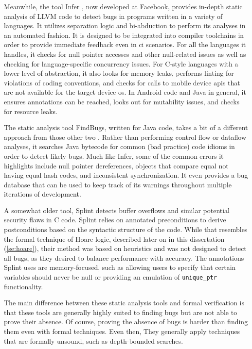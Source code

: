 Meanwhile, the tool Infer \autocite{calcagno2011infer}, now developed at Facebook,
provides in-depth static analysis of LLVM code to detect bugs in programs
written in a variety of languages.
It utilizes separation logic \autocite{reynolds2002separation}
and bi-abduction to perform its analyses in an automated fashion.
It is designed to be integrated into compiler toolchains
in order to provide immediate feedback even in \ac{ci} scenarios.
For all the languages it handles, it checks for null pointer accesses
and other null-related issues as well as checking for language-specific
concurrency issues.
For C-style languages with a lower level of abstraction,
it also looks for memory leaks, performs linting for violations of coding conventions,
and checks for calls to mobile device \acp{api} that are not available
for the target device \ac{os}.
In Android code and Java in general, it ensures annotations can be reached,
looks out for mutability issues, and checks for resource leaks.

The static analysis tool FindBugs, written for Java code,
takes a bit of a different approach from those other two
\autocite{hovemeyer2004findbugs}.
Rather than performing control flow or dataflow analyses,
it searches Java bytecode for common (bad practice) code idioms
in order to detect likely bugs. Much like Infer,
some of the common errors it highlights include null pointer dereferences,
objects that compare equal not having equal hash codes,
and inconsistent synchronization.
It even provides a bug database that can be used to keep track of its warnings
throughout multiple iterations of development.

A somewhat older tool, Splint \autocite{evans2002static} detects buffer overflows
and similar potential security flaws in C code.
Splint relies on annotated preconditions to derive postconditions
based on the syntactic structure of the code.
While that resembles the formal technique of Hoare logic,
described later on in this dissertation (\cref{se:hoare}),
their method was based on heuristics and was not designed to detect all bugs,
as they desired to balance performance with accuracy.
The annotations Splint uses are memory-focused, such as allowing users to specify
that certain variables should never be null or providing an emulation of
\lstinline|unique_ptr| functionality.

The main difference between these static analysis tools and formal verification
is that these tools are generally highly suited to finding bugs
but are not able to prove their absence. Of course, proving the absence of bugs
is harder than finding them even with formal techniques.
Even then, 
They generally apply techniques that are formally unsound, such as depth-bounded searches.

